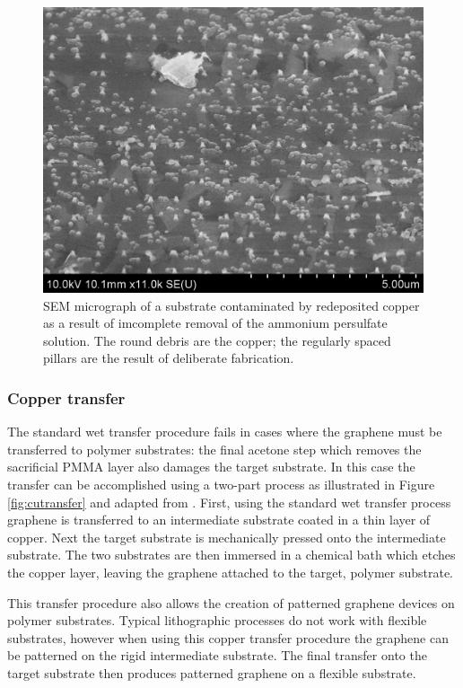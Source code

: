 \documentclass[edeposit,fullpage,draftthesis]{uiucthesis2009}
\begin{document}
         \begin{figure}
            \centering
            \includegraphics[width=0.4\linewidth]{images/experimentaltechniques/bad_xfer_cu.png}
            \caption[Copper contamination from bad graphene transfer]{
                SEM micrograph of a substrate contaminated by redeposited copper as a result of 
                imcomplete removal of the ammonium persulfate solution. The round debris are 
                the copper; the regularly spaced pillars are the result of deliberate fabrication.
            }
            \label{fig:bad_xfer_cu}
        \end{figure}


            \subsubsection{Copper transfer}
            
        The standard wet transfer procedure fails in cases where the graphene must be 
        transferred to polymer substrates: the final acetone step which removes the sacrificial
        PMMA layer also damages the target substrate.
        In this case the transfer can be accomplished using a two-part process as illustrated in
        Figure \ref{fig:cutransfer} and adapted from \cite{Lee2010}. First, using the standard wet transfer process
        graphene is transferred to an intermediate substrate coated in a thin layer of copper. Next the 
        target substrate is mechanically pressed onto the intermediate substrate. The two substrates
        are then immersed in a chemical bath which etches the copper layer, leaving the graphene
        attached to the target, polymer substrate.
        
        This transfer procedure also allows the creation of patterned graphene devices on polymer substrates.
        Typical lithographic processes do not work with flexible substrates, however when using this
        copper transfer procedure the graphene can be patterned on the rigid intermediate substrate. The
        final transfer onto the target substrate then produces patterned graphene on a flexible substrate.
            
\end{document}
